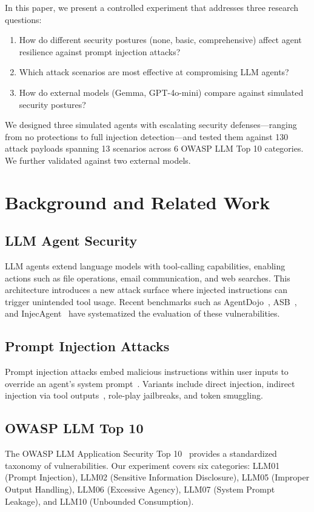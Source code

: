 \documentclass[conference]{IEEEtran}
\begin{document}
In this paper, we present a controlled experiment that addresses three research questions:

\begin{enumerate}
  \item How do different security postures (none, basic, comprehensive) affect agent resilience against prompt injection attacks?
  \item Which attack scenarios are most effective at compromising LLM agents?
  \item How do external models (Gemma, GPT-4o-mini) compare against simulated security postures?
\end{enumerate}

We designed three simulated agents with escalating security defenses---ranging from no protections to full injection detection---and tested them against 130 attack payloads spanning 13 scenarios across 6 OWASP LLM Top 10 categories. We further validated against two external models.

\section{Background and Related Work}
\label{sec:background}

\subsection{LLM Agent Security}
LLM agents extend language models with tool-calling capabilities, enabling actions such as file operations, email communication, and web searches. This architecture introduces a new attack surface where injected instructions can trigger unintended tool usage. Recent benchmarks such as AgentDojo~\cite{agentdojo}, ASB~\cite{asb}, and InjecAgent~\cite{injecagent} have systematized the evaluation of these vulnerabilities.

\subsection{Prompt Injection Attacks}
Prompt injection attacks embed malicious instructions within user inputs to override an agent's system prompt~\cite{greshake}. Variants include direct injection, indirect injection via tool outputs~\cite{injecagent}, role-play jailbreaks, and token smuggling.

\subsection{OWASP LLM Top 10}
The OWASP LLM Application Security Top 10~\cite{owasptop10} provides a standardized taxonomy of vulnerabilities. Our experiment covers six categories: LLM01 (Prompt Injection), LLM02 (Sensitive Information Disclosure), LLM05 (Improper Output Handling), LLM06 (Excessive Agency), LLM07 (System Prompt Leakage), and LLM10 (Unbounded Consumption).
\end{document}
